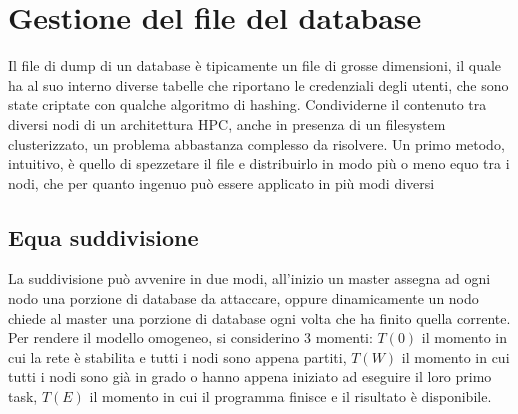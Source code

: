 \section{Gestione del file del database}
Il file di dump di un database è tipicamente un file di grosse dimensioni, il quale ha al suo interno diverse tabelle che riportano le credenziali degli utenti, che sono state criptate con qualche algoritmo di hashing. Condividerne il contenuto tra diversi nodi di un architettura HPC, anche in presenza di un filesystem clusterizzato, un problema abbastanza complesso da risolvere. Un primo metodo, intuitivo, è quello di spezzetare il file e distribuirlo in modo più o meno equo tra i nodi, che per quanto ingenuo può essere applicato in più modi diversi

\subsection{Equa suddivisione}
La suddivisione può avvenire in due modi, all'inizio un master assegna ad ogni nodo una porzione di database da attaccare, oppure dinamicamente un nodo chiede al master una porzione di database ogni volta che ha finito quella corrente. Per rendere il modello omogeneo, si considerino 3 momenti: $T(0)$  il momento in cui la rete è stabilita e tutti i nodi sono appena partiti, $T(W)$ il momento in cui tutti i nodi sono già in grado o hanno appena iniziato ad eseguire il loro primo task, $T(E)$ il momento in cui il programma finisce e il risultato è disponibile. 